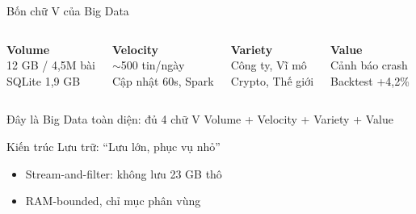 \documentclass[10pt,aspectratio=169]{beamer}
\begin{document}
\begin{frame}{Bốn chữ V của Big Data}
  \begin{columns}[T]
    \centering \textbf{\large Volume}\\
    12 GB / 4,5M bài\\
    SQLite 1,9 GB

    \centering \textbf{\large Velocity}\\
    $\sim$500 tin/ngày\\
    Cập nhật 60s, Spark

    \centering \textbf{\large Variety}\\
    Công ty, Vĩ mô\\
    Crypto, Thế giới

    \centering \textbf{\large Value}\\
    Cảnh báo crash\\
    Backtest +4,2\%
  \end{columns}

  \vspace{0.4cm}
  \begin{alertblock}{Đây là Big Data toàn diện: đủ 4 chữ V}
    Volume + Velocity + Variety + Value
  \end{alertblock}
\end{frame}

\begin{frame}{Kiến trúc Lưu trữ: ``Lưu lớn, phục vụ nhỏ''}
  \centering

  \vspace{0.3cm}
  \begin{itemize}
    \item Stream-and-filter: không lưu 23 GB thô
    \item RAM-bounded, chỉ mục phân vùng
  \end{itemize}
\end{frame}
\end{document}
